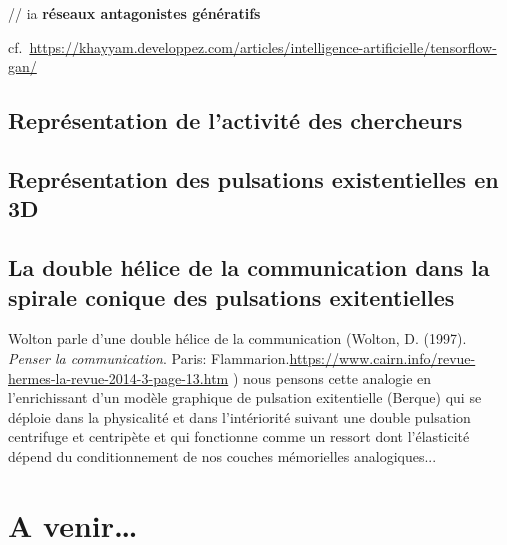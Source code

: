 \documentclass[
  letterpaper,
  DIV=11,
  numbers=noendperiod]{scrreprt}
\begin{document}
// ia \textbf{réseaux antagonistes génératifs}

cf.~\url{https://khayyam.developpez.com/articles/intelligence-artificielle/tensorflow-gan/}

\hypertarget{sec-datavizActiChercheur}{%
\subsection*{Représentation de l'activité des
chercheurs}\label{sec-datavizActiChercheur}}

\hypertarget{sec-pulsaExi3D}{%
\subsection*{Représentation des pulsations existentielles en
3D}\label{sec-pulsaExi3D}}

\hypertarget{la-double-huxe9lice-de-la-communication-dans-la-spirale-conique-des-pulsations-exitentielles}{%
\subsection*{La double hélice de la communication dans la spirale
conique des pulsations
exitentielles}\label{la-double-huxe9lice-de-la-communication-dans-la-spirale-conique-des-pulsations-exitentielles}}

Wolton parle d'une double hélice de la communication (Wolton, D. (1997).
\emph{Penser la communication}. Paris:
Flammarion.\url{https://www.cairn.info/revue-hermes-la-revue-2014-3-page-13.htm}
) nous pensons cette analogie en l'enrichissant d'un modèle graphique de
pulsation exitentielle (Berque) qui se déploie dans la physicalité et
dans l'intériorité suivant une double pulsation centrifuge et centripète
et qui fonctionne comme un ressort dont l'élasticité dépend du
conditionnement de nos couches mémorielles analogiques...

\hypertarget{a-venir}{%
\section*{A venir\ldots{}}\label{a-venir}}

\end{document}
